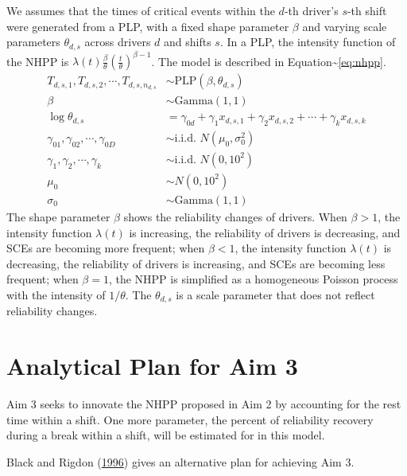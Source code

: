 \documentclass[12pt]{book}
\numberwithin{equation}{chapter}
\begin{document}
We assumes that the times of critical events within the \(d\)-th driver's \(s\)-th shift were generated from a PLP, with a fixed shape parameter \(\beta\) and varying scale parameters \(\theta_{d, s}\) across drivers \(d\) and shifts \(s\). In a PLP, the intensity function of the NHPP is \(\lambda(t) \frac{\beta}{\theta}(\frac{t}{\theta})^{\beta-1}\). The model is described in Equation\textasciitilde{}\ref{eq:nhpp}.
\begin{equation}\label{eq:nhpp}
\begin{aligned}
  T_{d, s, 1}, T_{d, s, 2}, \cdots , T_{d, s, n_{d, s}} & \sim \text{PLP}(\beta, \theta_{d, s})\\
  \beta & \sim \text{Gamma}(1, 1)\\
  \log\theta_{d, s} &= \gamma_{0d} + \gamma_{1}x_{d, s, 1} + \gamma_{2}x_{d, s, 2} + \cdots + \gamma_{k}x_{d, s, k}\\
  \gamma_{01}, \gamma_{02}, \cdots, \gamma_{0D} & \sim \text{i.i.d. }N(\mu_0, \sigma_0^2)\\
  \gamma_1, \gamma_2, \cdots, \gamma_k & \sim \text{i.i.d. }N(0, 10^2)\\
  \mu_0 &\sim N(0, 10^2) \\
  \sigma_0 &\sim \text{Gamma}(1, 1)
\end{aligned}
\end{equation}
The shape parameter \(\beta\) shows the reliability changes of drivers. When \(\beta > 1\), the intensity function \(\lambda(t)\) is increasing, the reliability of drivers is decreasing, and SCEs are becoming more frequent; when \(\beta < 1\), the intensity function \(\lambda(t)\) is decreasing, the reliability of drivers is increasing, and SCEs are becoming less frequent; when \(\beta = 1\), the NHPP is simplified as a homogeneous Poisson process with the intensity of \(1/\theta\). The \(\theta_{d, s}\) is a scale parameter that does not reflect reliability changes.

\hypertarget{analytical-plan-for-aim-3}{%
\section{Analytical Plan for Aim 3}\label{analytical-plan-for-aim-3}}

Aim 3 seeks to innovate the NHPP proposed in Aim 2 by accounting for the rest time within a shift. One more parameter, the percent of reliability recovery during a break within a shift, will be estimated for in this model.

Black and Rigdon (\protect\hyperlink{ref-black1996statistical}{1996}) gives an alternative plan for achieving Aim 3.
\end{document}
